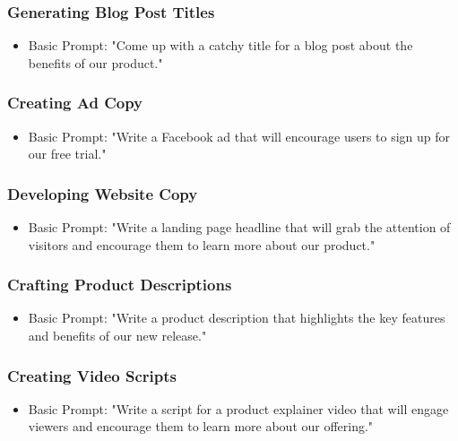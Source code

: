 \begin{frame}[fragile]\frametitle{Generating Blog Post Titles}
\begin{itemize}
\item Basic Prompt: "Come up with a catchy title for a blog post about the benefits of our product."
\end{itemize}
\end{frame}

\begin{frame}[fragile]\frametitle{Creating Ad Copy}
\begin{itemize}
\item Basic Prompt: "Write a Facebook ad that will encourage users to sign up for our free trial."
\end{itemize}
\end{frame}

\begin{frame}[fragile]\frametitle{Developing Website Copy}
\begin{itemize}
\item Basic Prompt: "Write a landing page headline that will grab the attention of visitors and encourage them to learn more about our product."
\end{itemize}
\end{frame}

\begin{frame}[fragile]\frametitle{Crafting Product Descriptions}
\begin{itemize}
\item Basic Prompt: "Write a product description that highlights the key features and benefits of our new release."
\end{itemize}
\end{frame}

\begin{frame}[fragile]\frametitle{Creating Video Scripts}
\begin{itemize}
\item Basic Prompt: "Write a script for a product explainer video that will engage viewers and encourage them to learn more about our offering."
\end{itemize}
\end{frame}

